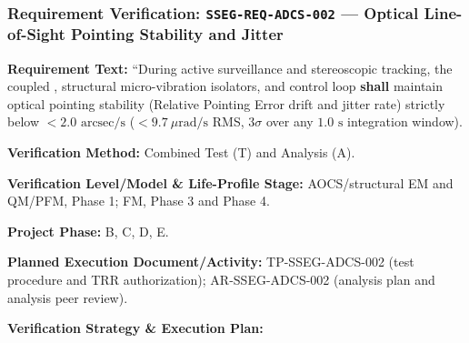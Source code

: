 \subsubsection{Requirement Verification: \texttt{SSEG-REQ-ADCS-002} --- Optical Line-of-Sight Pointing Stability and Jitter}
\label{ver:SSEG-REQ-ADCS-002}
\textbf{Requirement Text:} ``During active surveillance and stereoscopic tracking, the coupled , structural micro-vibration isolators, and  control loop \textbf{shall} maintain optical  pointing stability (Relative Pointing Error drift and jitter rate) strictly below $< 2.0\text{ arcsec/s}$ ($< 9.7~\mu\mathrm{rad/s}$ RMS, $3\sigma$ over any $1.0\text{ s}$ integration window).
\par\textbf{Verification Method:} Combined Test (T) and Analysis (A).
\par\textbf{Verification Level/Model \& Life-Profile Stage:} AOCS/structural EM and QM/PFM, Phase 1; FM, Phase 3 and Phase 4.
\par\textbf{Project Phase:} B, C, D, E.
\par\textbf{Planned Execution Document/Activity:} TP-SSEG-ADCS-002 (test procedure and TRR authorization); AR-SSEG-ADCS-002 (analysis plan and analysis peer review).
\par\textbf{Verification Strategy \& Execution Plan:}
